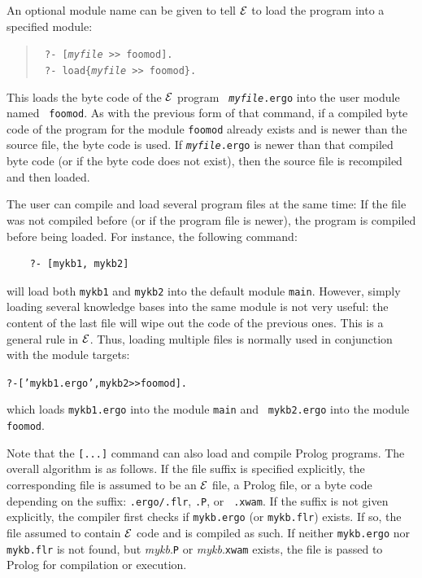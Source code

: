 \documentclass[11pt]{article}
\newcommand{\ERGO}{\mbox{\ensuremath{\cal{E}}\smaller{{\sc{RGO}}}}\xspace}
\newcommand{\FLSYSTEM}{\ERGO}
\newcommand{\flrext}{flr\xspace}
\newcommand{\ergoext}{ergo\xspace}
\newcommand{\ofile}{xwam}
\begin{document}
An optional module name can be given to tell \FLSYSTEM to
load the program into a specified module:
\begin{quote}
  \tt
    ?- [\textit{myfile} >{}> foomod].\\
    \tt
    ?- load\{\textit{myfile} >{}> foomod\}.
\end{quote}
This loads the byte code of the \FLSYSTEM program {\tt
  \textit{myfile}.\ergoext} into the user module named {\tt
  foomod}. As with the previous form of that command, if a compiled byte code of the program for the module
{\tt foomod} already exists and is newer than the source file, the byte code
is used.  If {\tt \textit{myfile}.\ergoext} is newer than that compiled byte code (or if
the byte code does not exist), then
the source file is recompiled and then loaded.

The user can compile and load several program
files at the same time: If the file was not compiled before (or if the
program file is newer), the program is compiled before being loaded.
For instance, the following command:
\begin{verbatim}
    ?- [mykb1, mykb2]
\end{verbatim}
will load both {\tt mykb1} and {\tt mykb2} into the default module
{\tt main}. However, simply loading several knowledge bases into the same module is not
very useful: the content of the last file will wipe out the code of the
previous ones. This is a general rule in \FLSYSTEM. Thus, loading
multiple files is normally used in conjunction with the module targets:
\begin{alltt}
    ?- ['mykb1.\ergoext', mykb2 >{}> foomod].
\end{alltt}
which loads {\tt mykb1.\ergoext} into the module {\tt main} and {\tt
  mykb2.\ergoext} into the module {\tt foomod}.


Note that the {\tt [...]} command can also load and compile Prolog programs.
The overall algorithm is as follows. If the file suffix is specified
explicitly, the corresponding file is assumed to be an \FLSYSTEM file, a Prolog
file, or a byte code depending on the suffix: {\tt .\ergoext/.\flrext}, {\tt .P}, or {\tt
  .\ofile}. If the suffix is not given explicitly, the compiler first checks if
\texttt{mykb.\ergoext} (or \texttt{mykb.\flrext})  exists. If so, the file assumed to contain \FLSYSTEM
code and is compiled as such. If neither
\texttt{mykb.\ergoext} nor \texttt{mykb.\flrext}  is not found, but {\it
  mykb}.{\tt P} or {\it mykb}.{\tt xwam} exists, the file is passed to Prolog for
compilation or execution.
\end{document}
